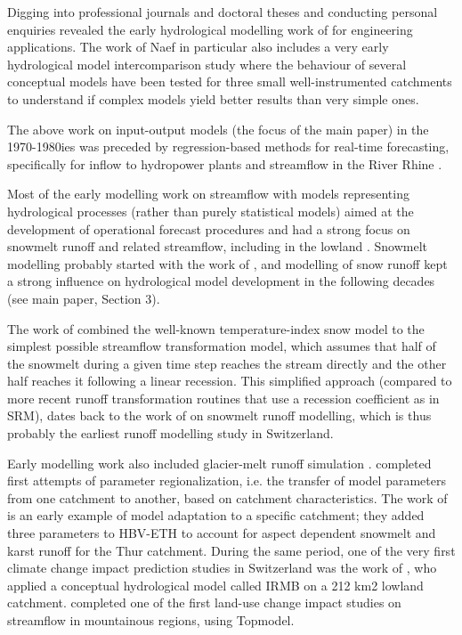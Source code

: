 \documentclass{article}
\begin{document}
Digging into professional journals and doctoral theses and conducting personal enquiries revealed the early hydrological modelling work of \citet{naef1974} for engineering applications. The work of Naef in particular also includes a very early hydrological model intercomparison study \citep{naef1977} where the behaviour of several conceptual models have been tested for three small well-instrumented catchments to understand if complex models yield better results than very simple ones.

The above work on input-output models (the focus of the main paper) in the 1970-1980ies was preceded by regression-based methods for real-time forecasting, specifically for inflow to hydropower plants \citep{jensenlang1973} and streamflow in the River Rhine \citep[e.g. to predict downstream summer droughts,][]{lugiez1969}.

Most of the early modelling work on streamflow with models representing hydrological processes (rather than purely statistical models) aimed at the development of operational forecast procedures and had a strong focus on snowmelt runoff and related streamflow, including in the lowland \citep{braun1986}. Snowmelt modelling probably started with the work of \citet{hoeck1952}, and modelling of snow runoff kept a strong influence on hydrological model development in the following decades (see main paper, Section 3).

The work of \citet{braun1986} combined the well-known temperature-index snow model \citep[underlying also the SRM model;][]{martinec1975} to the simplest possible streamflow transformation model, which assumes that half of the snowmelt during a given time step reaches the stream directly and the other half reaches it following a linear recession. This simplified approach (compared to more recent runoff transformation routines that use a recession coefficient as in SRM), dates back to the work of \citet{martinec1970} on snowmelt runoff modelling, which is thus probably the earliest runoff modelling study in Switzerland. 

Early modelling work also included glacier-melt runoff simulation \citep[][who used a model called HBV3-ETH, not in use anymore]{braun90}. \citet{braun1992} completed first attempts of parameter regionalization, i.e. the transfer of model parameters from one catchment to another, based on catchment characteristics. The work of \citet{hottelet1993} is an early example of model adaptation to a specific catchment; they added three parameters to HBV-ETH to account for aspect dependent snowmelt and karst runoff for the Thur catchment.
During the same period, one of the very first climate change impact prediction studies in Switzerland was the work of \citet{bultot1992}, who applied a conceptual hydrological model called IRMB on a 212 km2 lowland catchment. \citet{jordan1990} completed one of the first land-use change impact studies on streamflow in mountainous regions, using Topmodel. 
\end{document}
